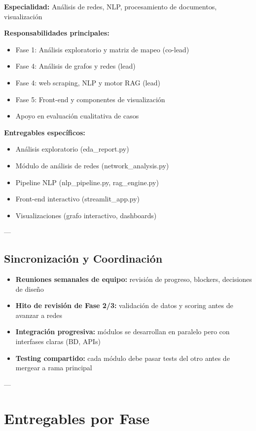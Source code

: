 \documentclass[11pt,a4paper,spanish]{book}
\numberwithin{equation}{chapter}
\numberwithin{figure}{chapter}
\begin{document}
\textbf{Especialidad:} Análisis de redes, NLP, procesamiento de documentos, visualización

\textbf{Responsabilidades principales:}
\begin{itemize}
\item Fase 1: Análisis exploratorio y matriz de mapeo (co-lead)
\item Fase 4: Análisis de grafos y redes (lead)
\item Fase 4: web scraping, NLP y motor RAG (lead)
\item Fase 5: Front-end y componentes de visualización
\item Apoyo en evaluación cualitativa de casos
\end{itemize}

\textbf{Entregables específicos:}
\begin{itemize}
\item Análisis exploratorio (eda\_report.py)
\item Módulo de análisis de redes (network\_analysis.py)
\item Pipeline NLP (nlp\_pipeline.py, rag\_engine.py)
\item Front-end interactivo (streamlit\_app.py)
\item Visualizaciones (grafo interactivo, dashboards)
\end{itemize}

---

\subsection{Sincronización y Coordinación}

\begin{itemize}
\item \textbf{Reuniones semanales de equipo:} revisión de progreso, blockers, decisiones de diseño
\item \textbf{Hito de revisión de Fase 2/3:} validación de datos y scoring antes de avanzar a redes
\item \textbf{Integración progresiva:} módulos se desarrollan en paralelo pero con interfases claras (BD, APIs)
\item \textbf{Testing compartido:} cada módulo debe pasar tests del otro antes de mergear a rama principal
\end{itemize}

---

\section{Entregables por Fase}
\end{document}
